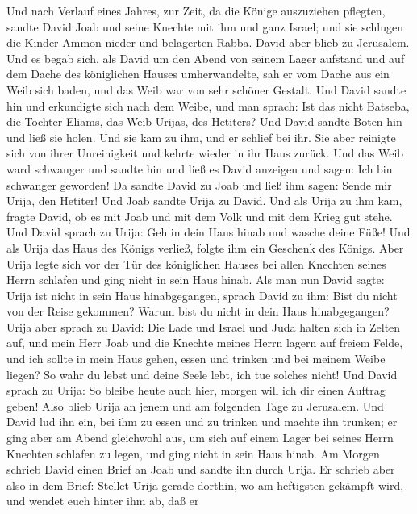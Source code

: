  Und nach Verlauf eines Jahres, zur Zeit, da die Könige
auszuziehen pflegten, sandte David Joab und seine Knechte mit ihm und
ganz Israel; und sie schlugen die Kinder Ammon nieder und belagerten
Rabba. David aber blieb zu Jerusalem.  Und es begab sich,
als David um den Abend von seinem Lager aufstand und auf dem Dache des
königlichen Hauses umherwandelte, sah er vom Dache aus ein Weib sich
baden, und das Weib war von sehr schöner Gestalt.  Und
David sandte hin und erkundigte sich nach dem Weibe, und man sprach: Ist
das nicht Batseba, die Tochter Eliams, das Weib Urijas, des Hetiters?
 Und David sandte Boten hin und ließ sie holen. Und sie
kam zu ihm, und er schlief bei ihr. Sie aber reinigte sich von ihrer
Unreinigkeit und kehrte wieder in ihr Haus zurück.  Und
das Weib ward schwanger und sandte hin und ließ es David anzeigen und
sagen: Ich bin schwanger geworden!  Da sandte David zu
Joab und ließ ihm sagen: Sende mir Urija, den Hetiter! Und Joab sandte
Urija zu David.  Und als Urija zu ihm kam, fragte David,
ob es mit Joab und mit dem Volk und mit dem Krieg gut stehe.
 Und David sprach zu Urija: Geh in dein Haus hinab und
wasche deine Füße! Und als Urija das Haus des Königs verließ, folgte ihm
ein Geschenk des Königs.  Aber Urija legte sich vor der
Tür des königlichen Hauses bei allen Knechten seines Herrn schlafen und
ging nicht in sein Haus hinab.  Als man nun David sagte:
Urija ist nicht in sein Haus hinabgegangen, sprach David zu ihm: Bist du
nicht von der Reise gekommen? Warum bist du nicht in dein Haus
hinabgegangen?  Urija aber sprach zu David: Die Lade und
Israel und Juda halten sich in Zelten auf, und mein Herr Joab und die
Knechte meines Herrn lagern auf freiem Felde, und ich sollte in mein
Haus gehen, essen und trinken und bei meinem Weibe liegen? So wahr du
lebst und deine Seele lebt, ich tue solches nicht!  Und
David sprach zu Urija: So bleibe heute auch hier, morgen will ich dir
einen Auftrag geben! Also blieb Urija an jenem und am folgenden Tage zu
Jerusalem.  Und David lud ihn ein, bei ihm zu essen und
zu trinken und machte ihn trunken; er ging aber am Abend gleichwohl aus,
um sich auf einem Lager bei seines Herrn Knechten schlafen zu legen, und
ging nicht in sein Haus hinab.  Am Morgen schrieb David
einen Brief an Joab und sandte ihn durch Urija.  Er
schrieb aber also in dem Brief: Stellet Urija gerade dorthin, wo am
heftigsten gekämpft wird, und wendet euch hinter ihm ab, daß er

